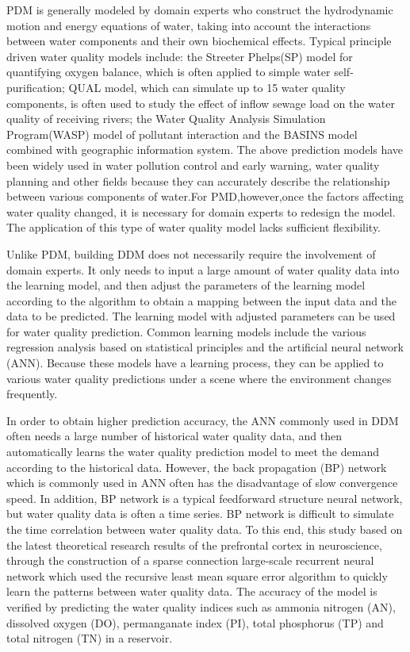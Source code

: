 \documentclass[runningheads]{llncs}
\begin{document}
PDM is generally modeled by domain experts who construct 
the hydrodynamic motion and energy equations of water, 
taking into account the interactions between water components 
and their own biochemical effects\cite{RN5,RN6}.
Typical principle driven water quality models include: the Streeter Phelps(SP) 
model for quantifying oxygen balance\cite{RN7}, which is often 
applied to simple water self-purification; 
QUAL model, which can simulate up to 15 water quality components, 
is often used to study the effect of inflow sewage load on the water quality 
of receiving rivers; the Water Quality Analysis Simulation Program(WASP) 
model of pollutant interaction\cite{RN6} and the BASINS model combined with geographic 
information system\cite{RN5,RN8}. The above prediction models have been widely used 
in water pollution control and early warning, water quality planning and 
other fields because they can accurately describe the relationship between 
various components of water.For PMD,however,once the factors affecting water quality changed,
it is necessary for domain experts to redesign the model. 
The application of this type of water quality model lacks sufficient flexibility.

Unlike PDM, building DDM does not necessarily require the involvement of domain experts. 
It only needs to input a large amount of water quality data into the learning model, 
and then adjust the parameters of the learning model according to the algorithm
to obtain a mapping between the input data and the data to be predicted. 
The learning model with adjusted parameters can be used for water quality prediction.
Common learning models include the various 
regression analysis based on statistical principles\cite{RN9,RN10,RN11,RN12} and the artificial
neural network (ANN)\cite{RN13,RN14,RN15,RN16,RN17,RN18}. Because these models have a 
learning process, they can be applied to various water quality 
predictions under a scene where the environment changes frequently.

In order to obtain higher prediction accuracy, the ANN 
commonly used in DDM often needs a large number of historical 
water quality data, and then automatically learns the water 
quality prediction model to meet the demand according 
to the historical data. However, the back propagation (BP) 
network which is commonly used in ANN often has the 
disadvantage of slow convergence speed. In addition, BP network is 
a typical feedforward structure neural network, but water quality data 
is often a time series\cite{RN19}. BP network is difficult to simulate the time 
correlation between water quality data. 
To this end, this study based on the latest theoretical research results of the prefrontal 
cortex in neuroscience\cite{RN20,RN21}, through the construction of a sparse connection 
large-scale recurrent neural network which used the recursive least mean 
square error algorithm to quickly learn the patterns between water quality data.
The accuracy of the model is verified by predicting the water quality 
indices such as ammonia nitrogen (AN), dissolved oxygen (DO), permanganate index (PI), 
total phosphorus (TP) and total nitrogen (TN) in a reservoir.
\end{document}
